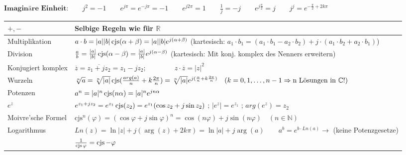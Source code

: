 $\textbf{Imaginäre Einheit:} \qquad j^2 = -1 \qquad e^{j\pi} = e^{-j\pi} = -1 \qquad e^{j2\pi} = 1 \qquad \frac{1}{j} = -j \qquad e^{j\frac{\pi}{2}}= j \qquad j^j = e^{-\frac{\pi}{2}+2k\pi}$


\renewcommand{\arraystretch}{1.5}
\begin{tabular}{| l | l |}
\hline
	$+, -$
	& Selbige Regeln wie für $\mathbb{R}$\\

\hline
	Multiplikation
	&$a \cdot b = 
		|a| |b| \operatorname{cjs}(\alpha + \beta) = 
		|a| |b| e^{j(\alpha + \beta)}$ (kartesisch: $a_1 \cdot b_1 = (a_1 \cdot b_1 - a_2 \cdot b_2) + j \cdot (a_1 \cdot b_2 + a_2 \cdot b_1)$)\\

\hline
	Division
	&$\frac{a}{b} = 
		\frac{\left|a\right|}{\left|b\right|} \operatorname{cjs}(\alpha - \beta) =
		\frac{\left|a\right|}{\left|b\right|} e^{j(\alpha - \beta)}$ (kartesisch: Mit
		konj. komplex des Nenners erweitern) \\

\hline
	Konjugiert komplex
	&$\overline{z} = \overline{z_1 + jz_2} = z_1 - jz_2; \qquad \qquad z \cdot \overline{z} = |z|^2$\\

\hline
	Wurzeln
	&$\sqrt[n]{a} = \sqrt[n]{|a|} \operatorname{cjs}(\frac{arg(a)}{n}+k\frac{2\pi}{n}) = 
	\sqrt[n]{|a|} e^{j(\frac{\alpha}{n} + k \frac{2\pi}{n})} \quad (k = 0, 1,
	\ldots, n-1 \Rightarrow \text{n Lösungen in } \mathbb{C} !)$ \\

\hline
	Potenzen
	&$a^n = |a|^n \operatorname{cjs}(n\alpha) = 
	|a|^n e^{jn\alpha}$\\

\hline
	$e^z$ &$e^{z_1+jz_2} = e^{z_1} \operatorname{cjs}(z_2) = e^{z_1} (\cos{z_2} + j\sin{z_2})$ ; $|e^z| = e^{z_1}$ ; $arg(e^z) = z_2$\\
	
\hline
	Moivre'sche Formel
	&$\text{cjs}^n(\varphi) =
	(\cos{\varphi} + j\sin{\varphi})^n = 
	\cos(n\varphi) +j\sin(n\varphi) \quad (n \in \mathbb{N})$\\

\hline
	Logarithmus
	&$Ln(z) = \ln{|z|} + j (\arg(z) + 2k \pi)=\ln|a|+j\arg(a) \qquad a^b = e^{b\cdot Ln(a)} \rightarrow$ (keine Potenzgesetze) \\

\hline
	& $\frac{1}{\operatorname{cjs}{\varphi}} = \operatorname{cjs}{-\varphi}$ \\
\hline
\end{tabular}
\renewcommand{\arraystretch}{1}\\

